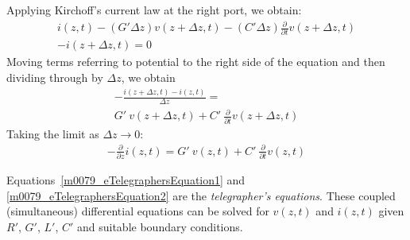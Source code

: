 Applying Kirchoff's current law at the right port, we obtain:
%
\begin{multline}
i(z,t) - \left( G'\Delta z \right) v(z+\Delta z,t) - \left( C' \Delta z\right) \frac{\partial}{\partial t} v(z+\Delta z,t) \\ - i(z+\Delta z,t) = 0
\end{multline}
%
Moving terms referring to potential to the right side of the equation and then dividing through by $\Delta z$, we obtain
%
\begin{multline}
-\frac{i(z+\Delta z,t)-i(z,t)}{\Delta z} = \\
G'~v(z+\Delta z,t) + C'~\frac{\partial}{\partial t} v(z+\Delta z,t)
\end{multline}
%
Taking the limit as $\Delta z \rightarrow 0$:
%
\begin{multline}
\boxed{
-\frac{\partial}{\partial z} i(z,t) = 
G'~v(z,t) + C'~\frac{\partial}{\partial t} v(z,t)
}
\label{m0079_eTelegraphersEquation2}
\end{multline}
%
\begin{mdframed}[backgroundcolor=yellow!20,nobreak=true] 
Equations~\ref{m0079_eTelegraphersEquation1} and \ref{m0079_eTelegraphersEquation2} are the \emph{telegrapher's equations}.  These coupled (simultaneous) differential equations can be solved for $v(z,t)$ and $i(z,t)$ given $R'$, $G'$, $L'$, $C'$ and suitable boundary conditions.
\end{mdframed}

